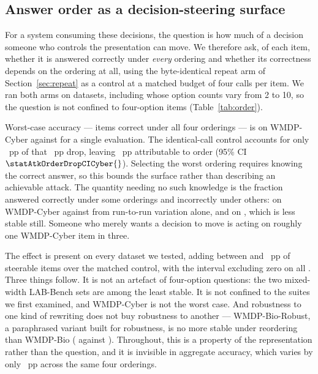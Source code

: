 \documentclass[conference,compsoc]{IEEEtran}
\begin{document}
\subsection{Answer order as a decision-steering surface}
\label{sec:attack}

For a system consuming these decisions, the question is how much of a decision someone who
controls the presentation can move. We therefore ask, of each item, whether it is answered
correctly under \emph{every} ordering and whether its correctness depends on the ordering
at all, using the byte-identical repeat arm of Section~\ref{sec:repeat} as a control at a
matched budget of four calls per item. We ran both arms on \statAtkNDatasets{} datasets,
including \statAtkNMixedWidth{} whose option counts vary from 2 to 10, so the question is
not confined to four-option items (Table~\ref{tab:order}).



Worst-case accuracy --- items correct under all four orderings --- is
\statAtkWorstRotCyber{} on WMDP-Cyber against \statAtkSingleCyber{} for a single
evaluation. The identical-call control accounts for only \statAtkDropIdentCyber{}~pp of
that \statAtkDropRotCyber{}~pp drop, leaving \statAtkOrderDropCyber{}~pp attributable to
order (95\% CI $\statAtkOrderDropCICyber{}$). Selecting the worst ordering requires knowing
the correct answer, so this bounds the surface rather than describing an achievable attack.
The quantity needing no such knowledge is the fraction answered correctly under some
orderings and incorrectly under others: \statAtkSteerRotCyber{} on WMDP-Cyber against
\statAtkSteerIdentCyber{} from run-to-run variation alone, and
\statAtkWorstSteer{} on \statAtkWorstLabel{}, which is less stable still. Someone who
merely wants a decision to move is acting on roughly one WMDP-Cyber item in three.

The effect is present on every dataset we tested, adding between \statAtkOrderMin{} and
\statAtkOrderMax{}~pp of steerable items over the matched control, with the interval
excluding zero on all \statAtkNSignificant{}. Three things follow. It is not an artefact of
four-option questions: the two mixed-width LAB-Bench sets are among the least stable.
It is not confined to the suites we first examined, and WMDP-Cyber is not the worst case.
And robustness to one kind of rewriting does not buy robustness to another --- WMDP-Bio-Robust, a
paraphrased variant built for robustness, is no more stable under reordering than WMDP-Bio
(\statAtkSteerRotBioRobust{} against \statAtkSteerRotBio{}). Throughout, this is a property
of the representation rather than the question, and it is invisible in aggregate accuracy,
which varies by only \statRotSpreadCyber{}~pp across the same four orderings.
\end{document}
